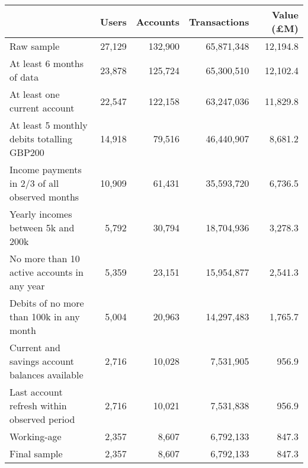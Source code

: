\begin{tabular}{lrrrr}
\toprule
                                               &  Users & Accounts & Transactions & Value (\pounds M) \\
\midrule
                                   Raw sample & 27,129 &  132,900 &   65,871,348 &          12,194.8 \\
                     At least 6 months of data & 23,878 &  125,724 &   65,300,510 &          12,102.4 \\
                  At least one current account & 22,547 &  122,158 &   63,247,036 &          11,829.8 \\
    At least 5 monthly debits totalling GBP200 & 14,918 &   79,516 &   46,440,907 &           8,681.2 \\
 Income payments in 2/3 of all observed months & 10,909 &   61,431 &   35,593,720 &           6,736.5 \\
            Yearly incomes between 5k and 200k &  5,792 &   30,794 &   18,704,936 &           3,278.3 \\
   No more than 10 active accounts in any year &  5,359 &   23,151 &   15,954,877 &           2,541.3 \\
      Debits of no more than 100k in any month &  5,004 &   20,963 &   14,297,483 &           1,765.7 \\
Current and savings account balances available &  2,716 &   10,028 &    7,531,905 &             956.9 \\
   Last account refresh within observed period &  2,716 &   10,021 &    7,531,838 &             956.9 \\
                                   Working-age &  2,357 &    8,607 &    6,792,133 &             847.3 \\
                                  Final sample &  2,357 &    8,607 &    6,792,133 &             847.3 \\
\bottomrule
\end{tabular}
